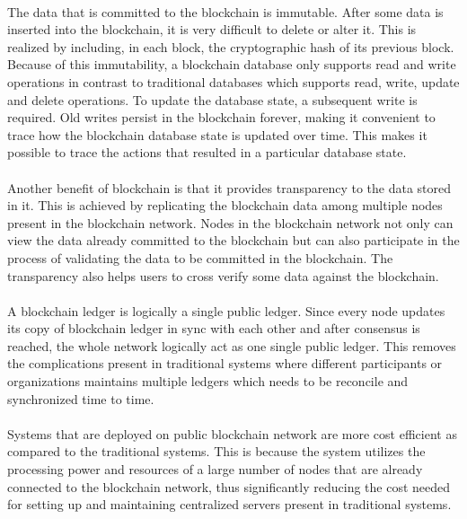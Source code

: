 \documentclass{article}
\begin{document}
        \paragraph{}
        The data that is committed to the blockchain is immutable. After some data is inserted into the blockchain, it is very difficult to delete or alter it. This is realized by including, in each block, the cryptographic hash of its previous block. Because of this immutability, a blockchain database only supports read and write operations in contrast to traditional databases which supports read, write, update and delete operations. To update the database state, a subsequent write is required. Old writes persist in the blockchain forever, making it convenient to trace how the blockchain database state is updated over time. This makes it possible to trace the actions that resulted in a particular database state.

        \paragraph{}
        Another benefit of blockchain is that it provides transparency to the data stored in it. This is achieved by replicating the blockchain data among multiple nodes present in the blockchain network. Nodes in the blockchain network not only can view the data already committed to the blockchain but can also participate in the process of validating the data to be committed in the blockchain. The transparency also helps users to cross verify some data against the blockchain.  

        \paragraph{}
        A blockchain ledger is logically a single public ledger. Since every node updates its copy of blockchain ledger in sync with each other and after consensus is reached, the whole network logically act as one single public ledger. This removes the complications present in traditional systems where different participants or organizations maintains multiple ledgers which needs to be reconcile and synchronized time to time.
        
        \paragraph{}
        Systems that are deployed on public blockchain network are more cost efficient as compared to the traditional systems. This is because the system utilizes the processing power and resources of a large number of nodes that are already connected to the blockchain network, thus significantly reducing the cost needed for setting up and maintaining centralized servers present in traditional systems.
\end{document}
